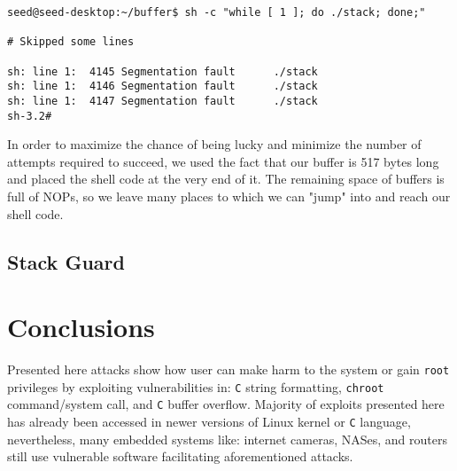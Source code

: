 \documentclass[12pt, a4paper, pdflatex]{article}
\begin{document}
\vspace{1em}
\lstset{
	captionpos=b,
	frame=single,
	language=BASH,
	breaklines=true,
	caption=Getting root access with address space randomization,
	label=bof:loop,
}
\begin{lstlisting}
seed@seed-desktop:~/buffer$ sh -c "while [ 1 ]; do ./stack; done;"

# Skipped some lines

sh: line 1:  4145 Segmentation fault      ./stack
sh: line 1:  4146 Segmentation fault      ./stack
sh: line 1:  4147 Segmentation fault      ./stack
sh-3.2# 

\end{lstlisting}

In order to maximize the chance of being lucky and minimize the number of attempts required to succeed, we used the fact that our buffer is 517 bytes long and placed the shell code at the very end of it. The remaining space of buffers is full of NOPs, so we leave many places to which we can "jump" into and reach our shell code.

\subsection{Stack Guard}

\lipsum[2]


\section{Conclusions}
Presented here attacks show how user can make harm to the system or gain \texttt{root} privileges by exploiting vulnerabilities in: \texttt{C} string formatting, \texttt{chroot} command/system call, and \texttt{C} buffer overflow. Majority of exploits presented here has already been accessed in newer versions of Linux kernel or \texttt{C} language, nevertheless, many embedded systems like: internet cameras, NASes, and routers still use vulnerable software facilitating aforementioned attacks.


\vfill


\end{document}
